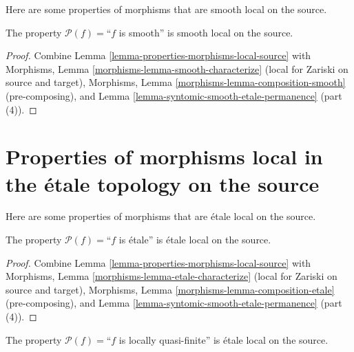 \noindent
Here are some properties of morphisms that are smooth local on the source.

\begin{lemma}
\label{lemma-smooth-smooth-local-source}
The property $\mathcal{P}(f)=$``$f$ is smooth''
is smooth local on the source.
\end{lemma}

\begin{proof}
Combine Lemma \ref{lemma-properties-morphisms-local-source} with
Morphisms, Lemma \ref{morphisms-lemma-smooth-characterize}
(local for Zariski on source and target),
Morphisms, Lemma \ref{morphisms-lemma-composition-smooth} (pre-composing), and
Lemma \ref{lemma-syntomic-smooth-etale-permanence} (part (4)).
\end{proof}



\section{Properties of morphisms local in the \'etale topology on the source}
\label{section-etale-local-source}

\noindent
Here are some properties of morphisms that are \'etale local on the source.

\begin{lemma}
\label{lemma-etale-etale-local-source}
The property $\mathcal{P}(f)=$``$f$ is \'etale''
is \'etale local on the source.
\end{lemma}

\begin{proof}
Combine Lemma \ref{lemma-properties-morphisms-local-source} with
Morphisms, Lemma \ref{morphisms-lemma-etale-characterize}
(local for Zariski on source and target),
Morphisms, Lemma \ref{morphisms-lemma-composition-etale} (pre-composing), and
Lemma \ref{lemma-syntomic-smooth-etale-permanence} (part (4)).
\end{proof}

\begin{lemma}
\label{lemma-locally-quasi-finite-etale-local-source}
The property $\mathcal{P}(f)=$``$f$ is locally quasi-finite''
is \'etale local on the source.
\end{lemma}

